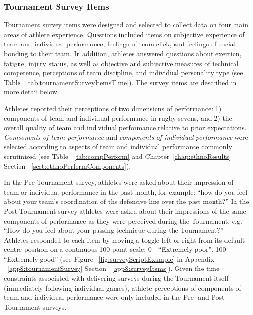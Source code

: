 \begin{CJK}{UTF8}{gbsn}
\subsubsection{Tournament Survey Items\label{survey:Tournament Survey Items}}

Tournament survey items were designed and selected to collect data on four main areas of athlete experience.  Questions included items on subjective experience of team and individual performance, feelings of team click, and feelings of social bonding to their team.  In addition, athletes answered questions about exertion, fatigue, injury status, as well as objective and subjective measures of technical competence, perceptions of team discipline, and individual personality type (see Table ~\ref{tab:tournamentSurveyItemsTime}). The survey items are described in more detail below.




Athletes reported their perceptions of two dimensions of performance: 1) components of team and individual performance in rugby sevens, and 2) the overall quality of team and individual performance relative to prior expectations.  \textit{Components of team performance} and \textit{components of individual performance} were selected according to aspects of team and individual performance commonly scrutinised (see Table ~\ref{tab:compPerform} and Chapter~\ref{chap:ethnoResults} Section ~\ref{sect:ethnoPerformComponents}).



In the Pre-Tournament survey, athletes were asked about their impression of team or individual performance in the past month, for example: ``how do you feel about your team's coordination of the defensive line over the past month?''  In the Post-Tournament survey athletes were asked about their impressions of the same components of performance as they were perceived during the Tournament, e.g. ``How do you feel about your passing technique during the Tournament?'' Athletes responded to each item by moving a toggle left or right from its default centre position on a continuous 100-point scale: 0 - ``Extremely poor'', 100 - ``Extremely good'' (see Figure ~\ref{fig:surveyScriptExample} in Appendix ~\ref{app8:tournamentSurvey} Section ~\ref{app8:surveyItems}).  Given the time constraints associated with delivering surveys during the Tournament itself (immediately following individual games), athlete perceptions of components of team and individual performance were only included in the Pre- and Post-Tournament surveys.


\end{CJK}
